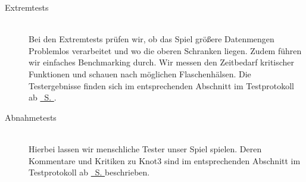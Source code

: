 \begin{description}
	
	\item[Extremtests] \hfill
	\\
	
	Bei den Extremtests prüfen wir, ob das Spiel  größere Datenmengen Problemlos verarbeitet und wo die oberen Schranken liegen. Zudem führen wir einfaches Benchmarking durch. Wir messen den Zeitbedarf kritischer Funktionen und schauen nach möglichen Flaschenhälsen. Die Testergebnisse finden sich im entsprechenden Abschnitt im Testprotokoll ab \hyperref[Abschnitt:Tests:Protokoll:Extrem]{\mousecursor~S. \pageref{Abschnitt:Tests:Protokoll:Extrem}}.\\



	\item[Abnahmetests] \hfill
	\\
	
	Hierbei lassen wir menschliche Tester unser Spiel spielen. Deren Kommentare und Kritiken zu Knot3 sind im entsprechenden Abschnitt im Testprotokoll ab \hyperref[Abschnitt:Tests:Protokoll:Abnahme]{\mousecursor~S. \pageref{Abschnitt:Tests:Protokoll:Abnahme}} beschrieben.\\
		
\end{description}







